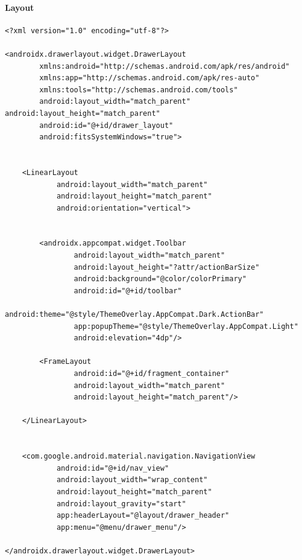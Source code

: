 \documentclass[a4paper]{article}
\begin{document}
\paragraph{Layout}
\begin{verbatim}
<?xml version="1.0" encoding="utf-8"?>

<androidx.drawerlayout.widget.DrawerLayout
        xmlns:android="http://schemas.android.com/apk/res/android"
        xmlns:app="http://schemas.android.com/apk/res-auto"
        xmlns:tools="http://schemas.android.com/tools"
        android:layout_width="match_parent" android:layout_height="match_parent"
        android:id="@+id/drawer_layout"
        android:fitsSystemWindows="true">


    <LinearLayout
            android:layout_width="match_parent"
            android:layout_height="match_parent"
            android:orientation="vertical">


        <androidx.appcompat.widget.Toolbar
                android:layout_width="match_parent"
                android:layout_height="?attr/actionBarSize"
                android:background="@color/colorPrimary"
                android:id="@+id/toolbar"
                android:theme="@style/ThemeOverlay.AppCompat.Dark.ActionBar"
                app:popupTheme="@style/ThemeOverlay.AppCompat.Light"
                android:elevation="4dp"/>

        <FrameLayout
                android:id="@+id/fragment_container"
                android:layout_width="match_parent"
                android:layout_height="match_parent"/>

    </LinearLayout>


    <com.google.android.material.navigation.NavigationView
            android:id="@+id/nav_view"
            android:layout_width="wrap_content"
            android:layout_height="match_parent"
            android:layout_gravity="start"
            app:headerLayout="@layout/drawer_header"
            app:menu="@menu/drawer_menu"/>

</androidx.drawerlayout.widget.DrawerLayout>
\end{verbatim}
\end{document}
